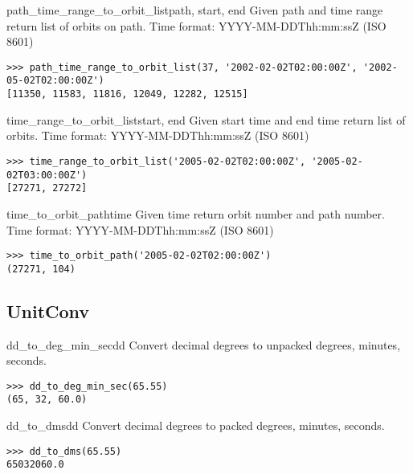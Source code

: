 \documentclass{howto}
\begin{document}
\begin{funcdesc}{path_time_range_to_orbit_list}{path, start, end}
  Given path and time range return list of orbits on path.  Time format: YYYY-MM-DDThh:mm:ssZ (ISO 8601)

\begin{verbatim}
>>> path_time_range_to_orbit_list(37, '2002-02-02T02:00:00Z', '2002-05-02T02:00:00Z')
[11350, 11583, 11816, 12049, 12282, 12515]
\end{verbatim}
\end{funcdesc}

\begin{funcdesc}{time_range_to_orbit_list}{start, end}
  Given start time and end time return list of orbits.  Time format: YYYY-MM-DDThh:mm:ssZ (ISO 8601)

\begin{verbatim}
>>> time_range_to_orbit_list('2005-02-02T02:00:00Z', '2005-02-02T03:00:00Z')
[27271, 27272]
\end{verbatim}
\end{funcdesc}

\begin{funcdesc}{time_to_orbit_path}{time}
  Given time return orbit number and path number.  Time format: YYYY-MM-DDThh:mm:ssZ (ISO 8601)

\begin{verbatim}
>>> time_to_orbit_path('2005-02-02T02:00:00Z')
(27271, 104)
\end{verbatim}
\end{funcdesc}


\subsection{UnitConv \label{unitconv}}

\begin{funcdesc}{dd_to_deg_min_sec}{dd}
  Convert decimal degrees to unpacked degrees, minutes, seconds.

\begin{verbatim}
>>> dd_to_deg_min_sec(65.55)
(65, 32, 60.0)
\end{verbatim}
\end{funcdesc}

\begin{funcdesc}{dd_to_dms}{dd}
    Convert decimal degrees to packed degrees, minutes, seconds.

\begin{verbatim}
>>> dd_to_dms(65.55)
65032060.0
\end{verbatim}
\end{funcdesc}
\end{document}
